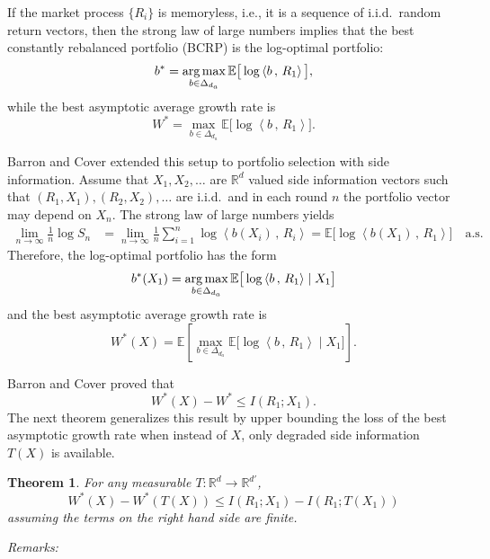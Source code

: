 \documentclass[11pt]{article}
\newtheorem{theorem}{Theorem}
\def\R{{\mathbb R}}
\def\EXP {{\mathbb E}}
\def\argmax{\mathop{\rm arg\,max}}
\newcommand\ip[2]{ \left\langle{#1} \, ,\, {#2} \right\rangle } %
\begin{document}
If the market process $\{R_i\}$ is memoryless, i.e.,
it is a sequence of i.i.d.\ random return vectors, 
then the strong law of large numbers implies that the best constantly rebalanced portfolio (BCRP) is
the log-optimal portfolio:
\[
b^*=\argmax_{b\in \Delta_{d_a}} \EXP\big[ \log\ip{b}{R_1} \big],
\]
while the best asymptotic average growth rate is
\[
W^*=\max_{b\in \Delta_{d_a}} \EXP\big[ \log\ip{b}{R_1}\big].
\]

Barron and Cover \cite{BaCo88} extended this setup to portfolio selection with side information.
Assume that $X_1,X_2,\dots$ are $\R^d$ valued side information vectors such that $(R_1,X_1), (R_2,X_2),\ldots$ are i.i.d.\ and in each round $n$ the portfolio vector may depend on $X_n$.
The strong law of large numbers yields
\begin{align*}
\lim_{n\to \infty} \frac 1n \log S_n
&=\lim_{n\to \infty} \frac 1n \sum_{i=1}^n \log\ip{b(X_i)}{R_i}
= \EXP\big[ \log\ip{b(X_1)}{R_1}\big]  \quad \text{a.s.}
\end{align*}
Therefore, the log-optimal portfolio has the form
\[
b^*(X_1)=\argmax_{b\in \Delta_{d_a}} \EXP\big[ \log\ip{b}{R_1}\mid X_1\big] 
\]
and the best asymptotic average growth rate is
\[
W^*(X)=\EXP\left[\max_{b\in \Delta_{d_a}} \EXP\big[ \log\ip{b}{R_1}\mid X_1\big] \right].
\]

Barron and Cover \cite[Thm.~2]{BaCo88} proved that
\begin{equation}
\label{BaCoibound} 
W^*(X)-W^*\le I(R_1;X_1).  
\end{equation}
The next theorem generalizes this result by upper bounding the loss of the best asymptotic growth rate when instead of $X$, only degraded side information $T(X)$ is available. 



\begin{theorem}
  \label{BaCoThm}
For any measurable $T: \R^d \to \R^{d'}$,
\[
    W^*(X)-W^*(T(X))\le I(R_1;X_1)-I(R_1;T(X_1))
\]
 assuming the terms on the right hand side are finite. 
\end{theorem}

\noindent \emph{Remarks:} 
\vspace{-3pt}
\end{document}

